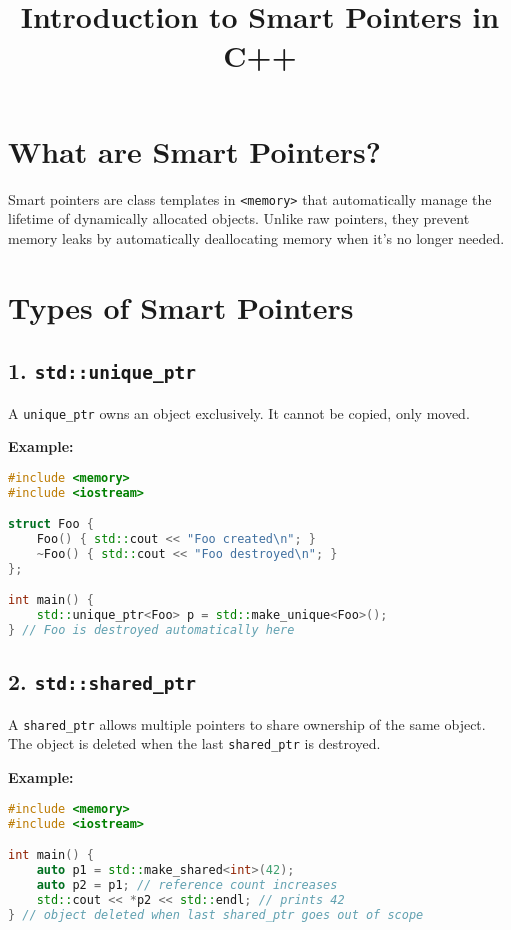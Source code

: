 \documentclass{article}
\title{Introduction to Smart Pointers in C++}
\date{}
\begin{document}
\maketitle

\section*{What are Smart Pointers?}
Smart pointers are class templates in \texttt{<memory>} that automatically manage the lifetime of dynamically allocated objects. Unlike raw pointers, they prevent memory leaks by automatically deallocating memory when it's no longer needed.

\section*{Types of Smart Pointers}

\subsection*{1. \texttt{std::unique\_ptr}}
A \texttt{unique\_ptr} owns an object exclusively. It cannot be copied, only moved.

\textbf{Example:}
\begin{lstlisting}[language=C++]
#include <memory>
#include <iostream>

struct Foo {
    Foo() { std::cout << "Foo created\n"; }
    ~Foo() { std::cout << "Foo destroyed\n"; }
};

int main() {
    std::unique_ptr<Foo> p = std::make_unique<Foo>();
} // Foo is destroyed automatically here
\end{lstlisting}

\subsection*{2. \texttt{std::shared\_ptr}}
A \texttt{shared\_ptr} allows multiple pointers to share ownership of the same object. The object is deleted when the last \texttt{shared\_ptr} is destroyed.

\textbf{Example:}
\begin{lstlisting}[language=C++]
#include <memory>
#include <iostream>

int main() {
    auto p1 = std::make_shared<int>(42);
    auto p2 = p1; // reference count increases
    std::cout << *p2 << std::endl; // prints 42
} // object deleted when last shared_ptr goes out of scope
\end{lstlisting}
\end{document}

